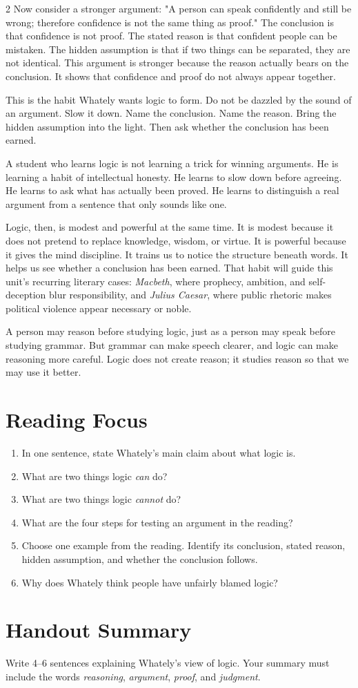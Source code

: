 \documentclass[12pt]{article}
\begin{document}
\begin{multicols}{2}
Now consider a stronger argument: "A person can speak confidently and still be wrong; therefore confidence is not the same thing as proof." The conclusion is that confidence is not proof. The stated reason is that confident people can be mistaken. The hidden assumption is that if two things can be separated, they are not identical. This argument is stronger because the reason actually bears on the conclusion. It shows that confidence and proof do not always appear together.

This is the habit Whately wants logic to form. Do not be dazzled by the sound of an argument. Slow it down. Name the conclusion. Name the reason. Bring the hidden assumption into the light. Then ask whether the conclusion has been earned.

A student who learns logic is not learning a trick for winning arguments. He is learning a habit of intellectual honesty. He learns to slow down before agreeing. He learns to ask what has actually been proved. He learns to distinguish a real argument from a sentence that only sounds like one.

Logic, then, is modest and powerful at the same time. It is modest because it does not pretend to replace knowledge, wisdom, or virtue. It is powerful because it gives the mind discipline. It trains us to notice the structure beneath words. It helps us see whether a conclusion has been earned. That habit will guide this unit's recurring literary cases: \textit{Macbeth}, where prophecy, ambition, and self-deception blur responsibility, and \textit{Julius Caesar}, where public rhetoric makes political violence appear necessary or noble.

A person may reason before studying logic, just as a person may speak before studying grammar. But grammar can make speech clearer, and logic can make reasoning more careful. Logic does not create reason; it studies reason so that we may use it better.

\section*{Reading Focus}
\begin{enumerate}[leftmargin=*]
\item In one sentence, state Whately's main claim about what logic is.
\item What are two things logic \textit{can} do?
\item What are two things logic \textit{cannot} do?
\item What are the four steps for testing an argument in the reading?
\item Choose one example from the reading. Identify its conclusion, stated reason, hidden assumption, and whether the conclusion follows.
\item Why does Whately think people have unfairly blamed logic?
\end{enumerate}

\section*{Handout Summary}
Write 4--6 sentences explaining Whately's view of logic. Your summary must include the words \textit{reasoning}, \textit{argument}, \textit{proof}, and \textit{judgment}.
\end{multicols}
\end{document}
